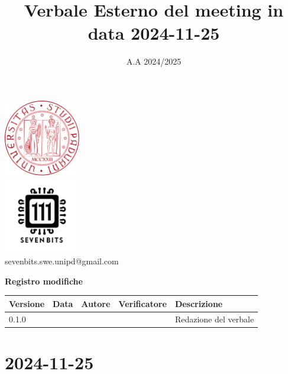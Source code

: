 \documentclass[12pt]{article}
\title{Verbale Esterno del meeting in data 2024-11-25}
\date{A.A 2024/2025}
\begin{document}
\maketitle
\begin{center}
\includegraphics[width=0.25\textwidth]{LogoUnipd}\\
\includegraphics[width=0.25\textwidth]{Sevenbitslogo}\\
sevenbits.swe.unipd@gmail.com\\
\vspace{2mm}

\textbf{Registro modifiche}\\
\vspace{2mm}
\begin{tabularx}{\textwidth}{|l|l|l|l|X|}
\hline
\textbf{Versione} & \textbf{Data} & \textbf{Autore} & \textbf{Verificatore} & \textbf{Descrizione} \\
\hline
0.1.0 &  &  & & Redazione del verbale\\
\hline

\end{tabularx}
\end{center}
\newpage
\tableofcontents
\newpage
\section{2024-11-25}
\end{document}
